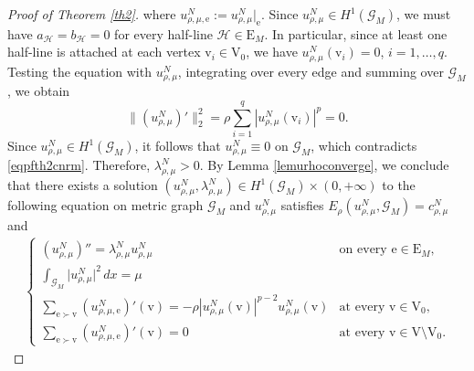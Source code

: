 \documentclass[11pt]{amsart}
\newcommand{\abs}[1]{\lvert#1\rvert}
\newcommand{\G}{\mathcal{G}}
\newcommand{\E}{\mathrm{E}}
\newcommand{\V}{\mathrm{V}}
\newcommand{\e}{\mathrm{e}}
\newcommand{\vv}{\mathrm{v}}
\numberwithin{equation}{section}
\begin{document}
\begin{proof}[Proof of Theorem \ref{th2}]
where  $u_{\rho,\mu,\e}^N:=u_{\rho,\mu}^N|_\e$.
Since $u_{\rho,\mu}^N \in H^1(\G_{M})$, we must have $a_\mathcal{H}=b_\mathcal{H}=0$ for every half-line $\mathcal{H} \in \E_M$. In particular, since at least one half-line is attached at each vertex \(\vv_i\in\V_0\), we have
$u_{\rho,\mu}^N(\vv_i)=0$,  $i=1,\ldots,q$.
Testing the equation with \(u_{\rho,\mu}^N\), integrating over every edge and
summing over \(\G_M\), we obtain
\[
\|(u_{\rho,\mu}^N)'\|_2^2
=
\rho\sum_{i=1}^q
|u_{\rho,\mu}^N(\vv_i)|^p
=
0.
\]
Since \(u_{\rho,\mu}^N \in H^1(\G_M)\), it follows that $u_{\rho,\mu}^N\equiv0$ on $\G_M$,
which contradicts \eqref{eqpfth2cnrm}. Therefore, $\lambda_{\rho,\mu}^N>0$. By Lemma \ref{lemurhoconverge}, we conclude that there exists a solution $(u_{\rho,\mu}^{N},\lambda_{\rho,\mu}^{N}) \in H^1(\G_{M}) \times (0, +\infty)$ to the following equation on metric graph $\G_M$ and $u_{\rho,\mu}^{N}$ satisfies $E_{\rho}(u_{\rho,\mu}^{N},\G_{M})=c_{\rho,\mu}^N$ and
\begin{align*}
\begin{cases} 
(u_{\rho,\mu}^N)'' = \lambda_{\rho,\mu}^N u_{\rho,\mu}^N & \text{on every }\e \in \E_M, \\ 
\int_{\G_{M}}\abs{u_{\rho,\mu}^N }^2\, dx = \mu & \\
\displaystyle\sum_{\e \succ \vv} (u_{\rho,\mu,\e}^N)' (\vv)= -\rho|u_{\rho,\mu}^N(\vv)|^{p-2}u_{\rho,\mu}^N(\vv)  & \text{at every } \vv \in \V_0,\\
\displaystyle\sum_{\e \succ \vv} (u_{\rho,\mu,\e}^N)' (\vv)=0  & \text{at every } \vv \in \V \setminus \V_0.
\end{cases}
\end{align*}


\end{proof}
\end{document}
